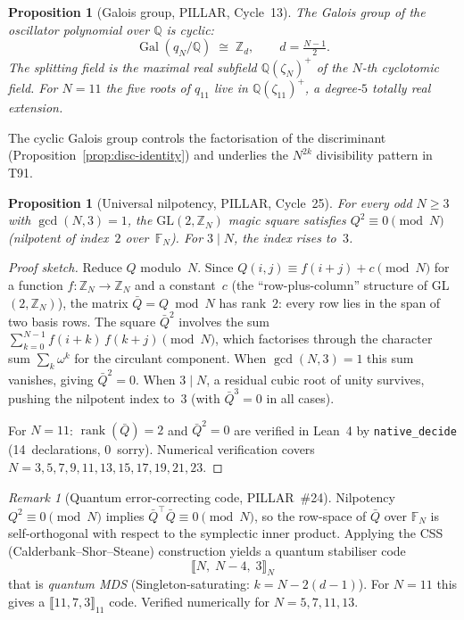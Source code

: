 \documentclass[aps,prd,twocolumn,superscriptaddress,floatfix,nofootinbib]{revtex4-2}
\newtheorem{proposition}[theorem]{Proposition}
\theoremstyle{definition}
\theoremstyle{remark}
\newtheorem{remark}[theorem]{Remark}
\begin{document}
\begin{proposition}[Galois group, PILLAR, Cycle~13]
\label{prop:galois-group}
The Galois group of the oscillator polynomial over $\mathbb{Q}$ is cyclic:
\[
  \operatorname{Gal}(q_N/\mathbb{Q}) \;\cong\; \mathbb{Z}_d,
  \qquad d = \tfrac{N-1}{2}.
\]
The splitting field is the maximal real subfield
$\mathbb{Q}(\zeta_N)^+$ of the $N$-th cyclotomic field.
For $N=11$ the five roots of $q_{11}$ live in $\mathbb{Q}(\zeta_{11})^+$,
a degree-$5$ totally real extension.
\end{proposition}

The cyclic Galois group controls the factorisation of the discriminant
(Proposition~\ref{prop:disc-identity}) and underlies the $N^{2k}$
divisibility pattern in T91.

\begin{proposition}[Universal nilpotency, PILLAR, Cycle~25]
\label{prop:nilpotent}
For every odd $N \geq 3$ with $\gcd(N,3)=1$, the $\mathrm{GL}(2,\mathbb{Z}_N)$
magic square satisfies $Q^2 \equiv 0 \pmod{N}$ (nilpotent of index~$2$
over~$\mathbb{F}_N$).  For $3 \mid N$, the index rises to~$3$.
\end{proposition}

\begin{proof}[Proof sketch]
Reduce $Q$ modulo~$N$.  Since $Q(i,j) \equiv f(i{+}j) + c \pmod{N}$ for
a function $f\colon \mathbb{Z}_N \to \mathbb{Z}_N$ and a constant~$c$
(the ``row-plus-column'' structure of GL$(2,\mathbb{Z}_N)$), the matrix
$\bar{Q} = Q \bmod N$ has rank~$2$: every row lies in the span of two
basis rows.  The square $\bar{Q}^2$ involves the sum
$\sum_{k=0}^{N-1} f(i{+}k)\,f(k{+}j) \pmod{N}$, which factorises through
the character sum $\sum_k \omega^k$ for the circulant component.
When $\gcd(N,3)=1$ this sum vanishes, giving $\bar{Q}^2 = 0$.
When $3\mid N$, a residual cubic root of unity survives, pushing the
nilpotent index to~$3$ (with $\bar{Q}^3 = 0$ in all cases).

For $N = 11$: $\operatorname{rank}(\bar{Q}) = 2$ and $\bar{Q}^2 = 0$ are verified in
Lean~4 by \texttt{native\_decide} (14~declarations, 0~sorry).
Numerical verification covers $N = 3,5,7,9,11,13,15,17,19,21,23$.
\end{proof}

\begin{remark}[Quantum error-correcting code, PILLAR~\#24]
\label{rem:qec-code}
Nilpotency $Q^2 \equiv 0 \pmod{N}$ implies
$\bar{Q}^{\top}\bar{Q} \equiv 0 \pmod{N}$,
so the row-space of $\bar{Q}$ over $\mathbb{F}_N$ is self-orthogonal
with respect to the symplectic inner product.
Applying the CSS (Calderbank--Shor--Steane) construction yields a
quantum stabiliser code
\[
  \llbracket N,\; N-4,\; 3 \rrbracket_N
\]
that is \emph{quantum MDS} (Singleton-saturating: $k = N - 2(d-1)$).
For $N=11$ this gives a $\llbracket 11,7,3 \rrbracket_{11}$ code.
Verified numerically for $N=5,7,11,13$.
\end{remark}
\end{document}
